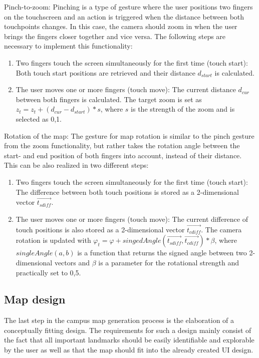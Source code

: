 Pinch-to-zoom: Pinching is a type of gesture where the user positions two fingers on the touchscreen and an action is triggered when the distance between both touchpoints changes. In this case, the camera should zoom in when the user brings the fingers closer together and vice versa. The following steps are necessary to implement this functionality:

\begin{enumerate}
	\item Two fingers touch the screen simultaneously for the first time (touch start): Both touch start positions are retrieved and their distance $d_{start}$ is calculated.
	\item The user moves one or more fingers (touch move): The current distance $d_{cur}$ between both fingers is calculated. The target zoom is set as $z_{t} = z_{t} + (d_{cur} - d_{start}) * s$, where $s$ is the strength of the zoom and is selected as 0,1.
\end{enumerate}

Rotation of the map: The gesture for map rotation is similar to the pinch gesture from the zoom functionality, but rather takes the rotation angle between the start- and end position of both fingers into account, instead of their distance. This can be also realized in two different steps:

\begin{enumerate}
	\item Two fingers touch the screen simultaneously for the first time (touch start): The difference between both touch positions is stored as a 2-dimensional vector $\overrightarrow{t_{sdiff}}$.
	\item  The user moves one or more fingers (touch move): The current difference of touch positions is also stored as a 2-dimensional vector $\overrightarrow{t_{cdiff}}$. The camera rotation is updated with $\varphi_{t} = \varphi + singedAngle(\overrightarrow{t_{sdiff}}, \overrightarrow{t_{cdiff}}) * \beta$, where $singleAngle(a, b)$ is a function that returns the signed angle between two 2-dimensional vectors and $\beta$ is a parameter for the rotational strength and practically set to 0,5.
\end{enumerate}

\subsection{Map design}
The last step in the campus map generation process is the elaboration of a conceptually fitting design. The requirements for such a design mainly consist of the fact that all important landmarks should be easily identifiable and explorable by the user as well as that the map should fit into the already created UI design.

